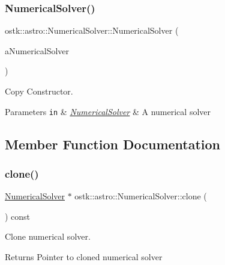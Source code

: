 \subsubsection{\texorpdfstring{Numerical\+Solver()}{NumericalSolver()}\hspace{0.1cm}{\footnotesize\ttfamily [2/2]}}
{\footnotesize\ttfamily ostk\+::astro\+::\+Numerical\+Solver\+::\+Numerical\+Solver (\begin{DoxyParamCaption}\item[{const \hyperlink{classostk_1_1astro_1_1_numerical_solver}{Numerical\+Solver} \&}]{a\+Numerical\+Solver }\end{DoxyParamCaption})}



Copy Constructor. 


\begin{DoxyParams}[1]{Parameters}
\mbox{\tt in}  & {\em \hyperlink{classostk_1_1astro_1_1_numerical_solver}{Numerical\+Solver}} & A numerical solver \\
\hline
\end{DoxyParams}


\subsection{Member Function Documentation}
\mbox{\label{classostk_1_1astro_1_1_numerical_solver_a5b96baffe23b77c14046e4fb7ffc89a1}} 
\subsubsection{\texorpdfstring{clone()}{clone()}}
{\footnotesize\ttfamily \hyperlink{classostk_1_1astro_1_1_numerical_solver}{Numerical\+Solver} $\ast$ ostk\+::astro\+::\+Numerical\+Solver\+::clone (\begin{DoxyParamCaption}{ }\end{DoxyParamCaption}) const}



Clone numerical solver. 

\begin{DoxyReturn}{Returns}
Pointer to cloned numerical solver 
\end{DoxyReturn}
\mbox{\label{classostk_1_1astro_1_1_numerical_solver_a0f768255c5f2f51f395e4515db245930}} 

